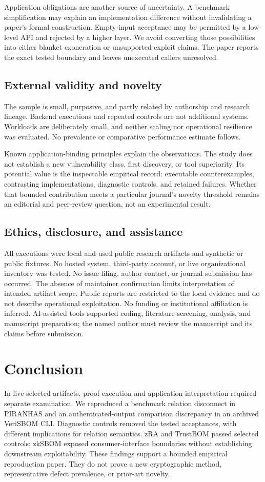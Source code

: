 \documentclass[sigconf,nonacm]{acmart}
\begin{document}
Application obligations are another source of uncertainty. A benchmark simplification may explain an implementation difference without invalidating a paper's formal construction. Empty-input acceptance may be permitted by a low-level API and rejected by a higher layer. We avoid converting those possibilities into either blanket exoneration or unsupported exploit claims. The paper reports the exact tested boundary and leaves unexecuted callers unresolved.

\subsection{External validity and novelty}
The sample is small, purposive, and partly related by authorship and research lineage. Backend executions and repeated controls are not additional systems. Workloads are deliberately small, and neither scaling nor operational resilience was evaluated. No prevalence or comparative performance estimate follows.

Known application-binding principles explain the observations. The study does not establish a new vulnerability class, first discovery, or tool superiority. Its potential value is the inspectable empirical record: executable counterexamples, contrasting implementations, diagnostic controls, and retained failures. Whether that bounded contribution meets a particular journal's novelty threshold remains an editorial and peer-review question, not an experimental result.

\subsection{Ethics, disclosure, and assistance}
All executions were local and used public research artifacts and synthetic or public fixtures. No hosted system, third-party account, or live organizational inventory was tested. No issue filing, author contact, or journal submission has occurred. The absence of maintainer confirmation limits interpretation of intended artifact scope. Public reports are restricted to the local evidence and do not describe operational exploitation. No funding or institutional affiliation is inferred. AI-assisted tools supported coding, literature screening, analysis, and manuscript preparation; the named author must review the manuscript and its claims before submission.

\section{Conclusion}
In five selected artifacts, proof execution and application interpretation required separate examination. We reproduced a benchmark relation disconnect in PIRANHAS and an authenticated-output comparison discrepancy in an archived VeriSBOM CLI. Diagnostic controls removed the tested acceptances, with different implications for relation semantics. zRA and TrustBOM passed selected controls; zkSBOM exposed consumer-interface boundaries without establishing downstream exploitability. These findings support a bounded empirical reproduction paper. They do not prove a new cryptographic method, representative defect prevalence, or prior-art novelty.
\end{document}
